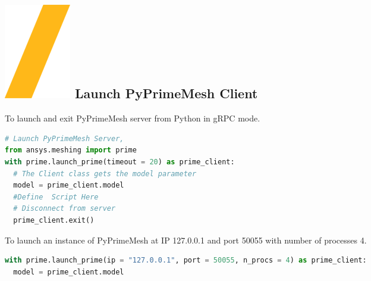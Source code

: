\documentclass[9pt,landscape]{article}
\begin{document}
\begin{multicols}{3}
\setlength{\premulticols}{1pt}
\setlength{\postmulticols}{1pt}
\setlength{\multicolsep}{1pt}
\setlength{\columnsep}{2pt}

\vfill
\section{\includegraphics[height=\fontcharht\font`\S]{slash.png} Launch PyPrimeMesh Client}
To launch and exit PyPrimeMesh server from Python in gRPC mode.\\
\begin{lstlisting}[language=Python]
# Launch PyPrimeMesh Server, 
from ansys.meshing import prime
with prime.launch_prime(timeout = 20) as prime_client:
  # The Client class gets the model parameter 
  model = prime_client.model
  #Define  Script Here
  # Disconnect from server
  prime_client.exit() 
\end{lstlisting}

To launch an instance of PyPrimeMesh at IP
127.0.0.1 and port 50055 with number of processes 4.
\begin{lstlisting}[language=Python]
  with prime.launch_prime(ip = "127.0.0.1", port = 50055, n_procs = 4) as prime_client:
  model = prime_client.model
\end{lstlisting}


\end{multicols}
\end{document}
